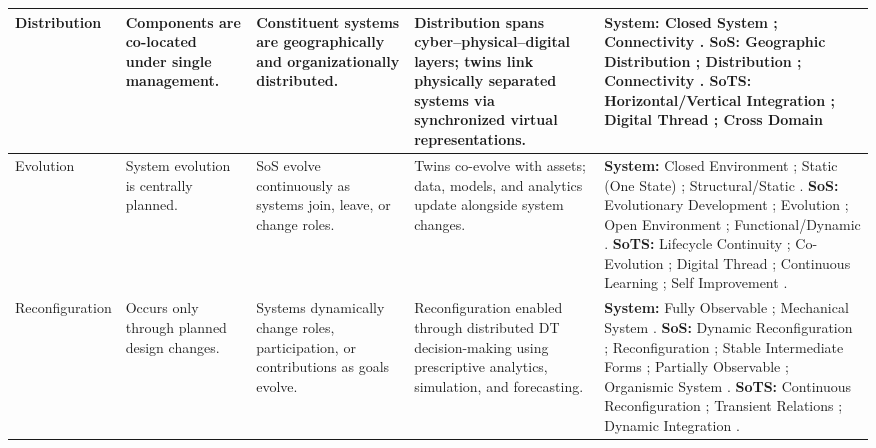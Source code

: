 \begin{table}[htbp]
\begin{adjustbox}{center}
\begin{tabularx}{1.15\textwidth}{
  >{\raggedright\arraybackslash}p{2.5cm}
  >{\raggedright\arraybackslash}p{3cm}
  >{\raggedright\arraybackslash}p{3cm}
  >{\raggedright\arraybackslash}p{3.7cm}
  >{\raggedright\arraybackslash}X }
Distribution &
Components are co-located under single management. &
Constituent systems are geographically and organizationally distributed. &
Distribution spans cyber--physical--digital layers; twins link physically separated systems via synchronized virtual representations. &
\textbf{System:} Closed System \cite{ackoff1971towards}; Connectivity \cite{boardman2006system}.\newline
\textbf{SoS:} Geographic Distribution \cite{maier1998architecting}; Distribution \cite{nielsen2015systems}; Connectivity \cite{boardman2006system}.\newline
\textbf{SoTS:} Horizontal/Vertical Integration \cite{michael2022integration}; Digital Thread \cite{borth2019digital}; Cross Domain \cite{dietz2020digital} \\

\hline

Evolution &
System evolution is centrally planned. &
SoS evolve continuously as systems join, leave, or change roles. &
Twins co-evolve with assets; data, models, and analytics update alongside system changes. &
\textbf{System:} Closed Environment \cite{jackson1984towards}; Static (One State) \cite{ackoff1971towards}; Structural/Static \cite{jordan1960some}.\newline
\textbf{SoS:} Evolutionary Development \cite{maier1998architecting}; Evolution \cite{nielsen2015systems}; Open Environment \cite{jackson1984towards}; Functional/Dynamic \cite{jordan1960some}.\newline
\textbf{SoTS:} Lifecycle Continuity \cite{michael2022integration}; Co-Evolution \cite{olsson2023systems}; Digital Thread \cite{borth2019digital}; Continuous Learning \cite{dietz2020digital}; Self Improvement \cite{esterle2021digital}. \\

\hline

Reconfiguration &
Occurs only through planned design changes. &
Systems dynamically change roles, participation, or contributions as goals evolve. &
Reconfiguration enabled through distributed DT decision-making using prescriptive analytics, simulation, and forecasting. &
\textbf{System:} Fully Observable \cite{jackson1984towards}; Mechanical System \cite{jordan1960some}.\newline
\textbf{SoS:} Dynamic Reconfiguration \cite{boardman2006system}; Reconfiguration \cite{nielsen2015systems}; Stable Intermediate Forms \cite{maier1998architecting}; Partially Observable \cite{jackson1984towards}; Organismic System \cite{jordan1960some}.\newline
\textbf{SoTS:} Continuous Reconfiguration \cite{gill2024toward}; Transient Relations \cite{dietz2020digital}; Dynamic Integration \cite{esterle2021digital}. \\


\end{tabularx}
\end{adjustbox}
\end{table}
